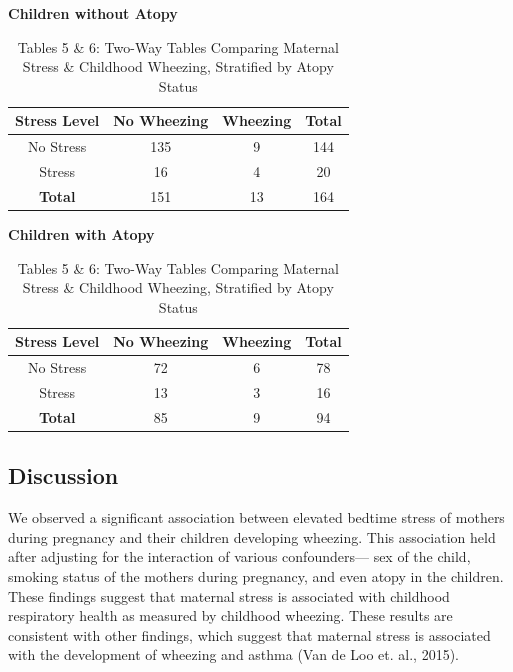 \documentclass{article}
\begin{document}
	\begin{table}[h]
		\centering
		\captionsetup{labelformat=empty}
		\footnotesize
		\caption{Tables 5 \& 6: Two-Way Tables Comparing Maternal Stress \& Childhood Wheezing, Stratified by Atopy Status}
		\begin{minipage}{0.48\linewidth}
			\centering
			\textbf{Children without Atopy} \\[2pt]
			\begin{tabular}{cccc} %
				\toprule
				\textbf{Stress Level} & \textbf{No Wheezing} & \textbf{Wheezing} & \textbf{Total} \\
				\midrule
				No Stress & 135 & 9 & 144 \\
				Stress & 16 & 4 & 20 \\
				\midrule
				\textbf{Total} & 151 & 13 & 164 \\
				\bottomrule
			\end{tabular}
		\end{minipage}
		\hfill
		\begin{minipage}{0.48\linewidth}
			\centering
			\textbf{Children with Atopy} \\[2pt]
			\begin{tabular}{cccc} %
				\toprule
				\textbf{Stress Level} & \textbf{No Wheezing} & \textbf{Wheezing} & \textbf{Total} \\
				\midrule
				No Stress & 72 & 6 & 78 \\
				Stress & 13 & 3 & 16 \\
				\midrule
				\textbf{Total} & 85 & 9 & 94 \\
				\bottomrule
			\end{tabular}
		\end{minipage}
	\end{table}

	\subsection*{Discussion}
	We observed a significant association between elevated bedtime stress of mothers during pregnancy and their children developing wheezing. This association held after adjusting for the interaction of various confounders— sex of the child, smoking status of the mothers during pregnancy, and even atopy in the children. These findings suggest that maternal stress is associated with childhood respiratory health as measured by childhood wheezing. These results are consistent with other findings, which suggest that maternal stress is associated with the development of wheezing and asthma (Van de Loo et. al., 2015).
	
\end{document}
